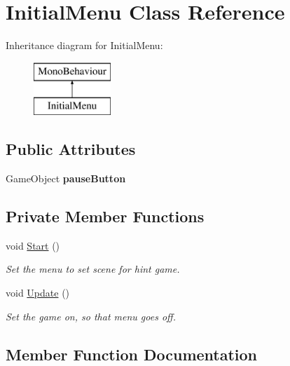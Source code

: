 \hypertarget{class_initial_menu}{}\section{Initial\+Menu Class Reference}
\label{class_initial_menu}
Inheritance diagram for Initial\+Menu\+:\begin{figure}[H]
\begin{center}
\leavevmode
\includegraphics[height=2.000000cm]{class_initial_menu}
\end{center}
\end{figure}
\subsection*{Public Attributes}
\begin{DoxyCompactItemize}
\item 
\hypertarget{class_initial_menu_a02ec109a2a273798bd5aff75ed7e9d67}{}\label{class_initial_menu_a02ec109a2a273798bd5aff75ed7e9d67} 
Game\+Object {\bfseries pause\+Button}
\end{DoxyCompactItemize}
\subsection*{Private Member Functions}
\begin{DoxyCompactItemize}
\item 
void \hyperlink{class_initial_menu_a4e3afff55963264f0c31ef3b5a780ce0}{Start} ()
\begin{DoxyCompactList}\small\item\em Set the menu to set scene for hint game. \end{DoxyCompactList}\item 
void \hyperlink{class_initial_menu_adaf7345803cf408da2a759ae689d5c56}{Update} ()
\begin{DoxyCompactList}\small\item\em Set the game on, so that menu goes off. \end{DoxyCompactList}\end{DoxyCompactItemize}


\subsection{Member Function Documentation}
\hypertarget{class_initial_menu_a4e3afff55963264f0c31ef3b5a780ce0}{}\label{class_initial_menu_a4e3afff55963264f0c31ef3b5a780ce0} 
